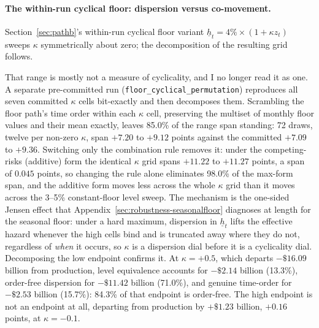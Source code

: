 \documentclass[12pt]{article}
\begin{document}
\paragraph{The within-run cyclical floor: dispersion versus co-movement.}
Section~\ref{sec:pathb}'s within-run cyclical floor variant $\underline{h}_t = 4\% \times (1 + \kappa z_t)$ sweeps $\kappa$ symmetrically about zero; the decomposition of the resulting grid follows.

That range is mostly not a measure of cyclicality, and I no longer read it as one. A separate pre-committed run (\texttt{floor\_cyclical\_permutation}) reproduces all seven committed $\kappa$ cells bit-exactly and then decomposes them. Scrambling the floor path's time order within each $\kappa$ cell, preserving the multiset of monthly floor values and their mean exactly, leaves 85.0\% of the range span standing: 72 draws, twelve per non-zero $\kappa$, span $+7.20$ to $+9.12$ points against the committed $+7.09$ to $+9.36$. Switching only the combination rule removes it: under the competing-risks (additive) form the identical $\kappa$ grid spans $+11.22$ to $+11.27$ points, a span of $0.045$ points, so changing the rule alone eliminates 98.0\% of the max-form span, and the additive form moves less across the whole $\kappa$ grid than it moves across the 3--5\% constant-floor level sweep. The mechanism is the one-sided Jensen effect that Appendix~\ref{sec:robustness-seasonalfloor} diagnoses at length for the seasonal floor: under a hard maximum, dispersion in $\underline{h}_t$ lifts the effective hazard whenever the high cells bind and is truncated away where they do not, regardless of \emph{when} it occurs, so $\kappa$ is a dispersion dial before it is a cyclicality dial. Decomposing the low endpoint confirms it. At $\kappa = +0.5$, which departs $-\$16.09$ billion from production, level equivalence accounts for $-\$2.14$ billion (13.3\%), order-free dispersion for $-\$11.42$ billion (71.0\%), and genuine time-order for $-\$2.53$ billion (15.7\%): 84.3\% of that endpoint is order-free. The high endpoint is not an endpoint at all, departing from production by $+\$1.23$ billion, $+0.16$ points, at $\kappa = -0.1$.
\end{document}

